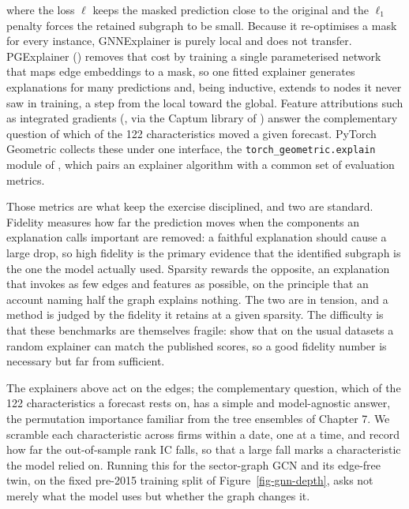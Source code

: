 where the loss $\ell$ keeps the masked prediction close to the original and the $\ell_1$ penalty forces the retained subgraph to be small. Because it re-optimises a mask for every instance, GNNExplainer is purely local and does not transfer. PGExplainer (\cite{luo2020parameterized}) removes that cost by training a single parameterised network that maps edge embeddings to a mask, so one fitted explainer generates explanations for many predictions and, being inductive, extends to nodes it never saw in training, a step from the local toward the global. Feature attributions such as integrated gradients (\cite{sundararajan2017axiomatic}, via the Captum library of \cite{kokhlikyan2020captum}) answer the complementary question of which of the 122 characteristics moved a given forecast. PyTorch Geometric collects these under one interface, the \texttt{torch\_geometric.explain} module of \cite{fey2019fast}, which pairs an explainer algorithm with a common set of evaluation metrics.

Those metrics are what keep the exercise disciplined, and two are standard. Fidelity measures how far the prediction moves when the components an explanation calls important are removed: a faithful explanation should cause a large drop, so high fidelity is the primary evidence that the identified subgraph is the one the model actually used. Sparsity rewards the opposite, an explanation that invokes as few edges and features as possible, on the principle that an account naming half the graph explains nothing. The two are in tension, and a method is judged by the fidelity it retains at a given sparsity. The difficulty is that these benchmarks are themselves fragile: \cite{agarwal2023evaluating} show that on the usual datasets a random explainer can match the published scores, so a good fidelity number is necessary but far from sufficient.

The explainers above act on the edges; the complementary question, which of the 122 characteristics a forecast rests on, has a simple and model-agnostic answer, the permutation importance familiar from the tree ensembles of Chapter 7. We scramble each characteristic across firms within a date, one at a time, and record how far the out-of-sample rank IC falls, so that a large fall marks a characteristic the model relied on. Running this for the sector-graph GCN and its edge-free twin, on the fixed pre-2015 training split of Figure~\ref{fig-gnn-depth}, asks not merely what the model uses but whether the graph changes it.

